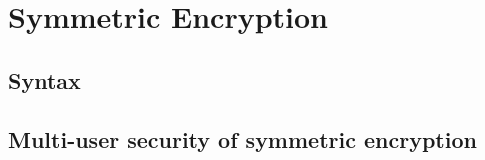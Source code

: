 \documentclass[../../main.tex]{subfiles}
\begin{document}
\onlyinsubfile
{
    
}

\section{Symmetric Encryption}\label{sec-se}
    \subsection{Syntax}
        
    \subsection{Multi-user security of symmetric encryption}\label{sec-se-mu-defs}
        
        



\onlyinsubfile
{
    \begin{small}
        
        
    \end{small}
}
\end{document}
